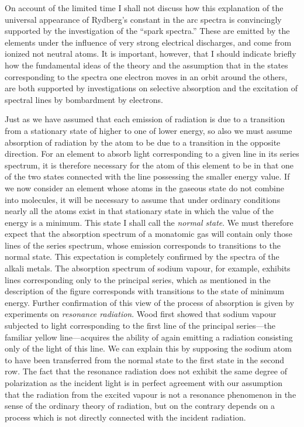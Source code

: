 On account of the limited time I shall not discuss how this
explanation of the universal appearance of Rydberg's constant in
the arc spectra is convincingly supported by the investigation of
the ``spark spectra.'' These are emitted by the elements under the
influence of very strong electrical discharges, and come from ionized
not neutral atoms. It is important, however, that I should indicate
briefly how the fundamental ideas of the theory and the assumption
that in the states corresponding to the spectra one electron moves
in an orbit around the others, are both supported by investigations
on selective absorption and the excitation of spectral lines by
bombardment by electrons.

 Just as we have
assumed that each emission of radiation is due to a transition from
a stationary state of higher to one of lower energy, so also we must
assume absorption of radiation by the atom to be due to a transition
in the opposite direction. For an element to absorb light corresponding
to a given line in its series spectrum, it is therefore
necessary for the atom of this element to be in that one of the two
states connected with the line possessing the smaller energy value.
If we now consider an element whose atoms in the gaseous state
do not combine into molecules, it will be necessary to assume that
under ordinary conditions nearly all the atoms exist in that stationary
state in which the value of the energy is a minimum. This state
I shall call the \emph{normal state}. We must therefore expect that the
absorption spectrum of a monatomic gas will contain only those
lines of the series spectrum, whose emission corresponds to transitions
to the normal state. This expectation is completely confirmed
by the spectra of the alkali metals. The absorption spectrum of
sodium vapour, for example, exhibits lines corresponding only to
the principal series, which as mentioned in the description of the
figure corresponds with transitions to the state of minimum energy.
Further confirmation of this view of the process of absorption is
given by experiments on \emph{resonance radiation}. Wood first showed
that sodium vapour subjected to light corresponding to the first
line of the principal series---the familiar yellow line---acquires the
ability of again emitting a radiation consisting only of the light of
this line. We can explain this by supposing the sodium atom to
have been transferred from the normal state to the first state in
the second row. The fact that the resonance radiation does not
exhibit the same degree of polarization as the incident light is
in perfect agreement with our assumption that the radiation from
the excited vapour is not a resonance phenomenon in the sense of
the ordinary theory of radiation, but on the contrary depends on a
process which is not directly connected with the incident radiation.

